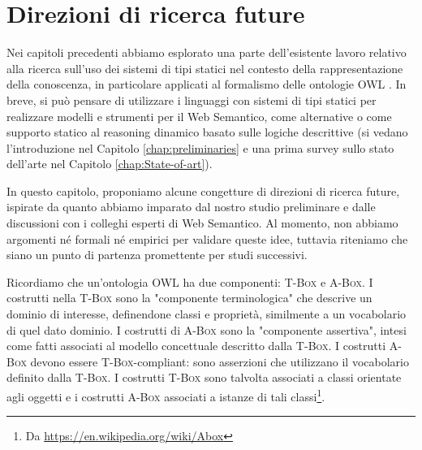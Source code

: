 
\chapter[Direzioni di ricerca future]{Direzioni di ricerca future}
\label{chap:FutureWork}

Nei capitoli precedenti abbiamo esplorato una parte dell'esistente lavoro relativo alla ricerca sull'uso dei sistemi di tipi statici nel contesto della 
rappresentazione della conoscenza, in particolare applicati al formalismo delle ontologie OWL \cite{OWL}. In breve, si può pensare di utilizzare i 
linguaggi con sistemi di tipi statici per realizzare modelli e strumenti per  il Web Semantico, come alternative o come supporto statico al reasoning 
dinamico basato sulle logiche descrittive (si vedano l'introduzione nel Capitolo \ref{chap:preliminaries} e una prima survey sullo stato dell'arte nel Capitolo \ref{chap:State-of-art}).

In questo capitolo, proponiamo alcune congetture di direzioni di ricerca future, ispirate da quanto abbiamo imparato dal nostro studio preliminare e dalle 
discussioni con i colleghi esperti di Web Semantico. Al momento, non abbiamo argomenti né formali né empirici per validare queste idee, tuttavia riteniamo 
che siano un punto di partenza promettente per studi successivi.

Ricordiamo che un'ontologia OWL ha due componenti: \textsc{T-Box} e \textsc{A-Box}. I costrutti nella \textsc{T-Box} sono la "componente terminologica" che descrive un dominio di 
interesse, definendone classi e proprietà, similmente a un vocabolario di quel dato dominio. I costrutti di \textsc{A-Box} sono la "componente assertiva", intesi come fatti associati al modello concettuale descritto dalla \textsc{T-Box}. I costrutti \textsc{A-Box} devono essere \textsc{T-Box}-compliant: sono asserzioni che utilizzano il 
vocabolario definito dalla \textsc{T-Box}. I costrutti \textsc{T-Box} sono talvolta associati a classi orientate agli oggetti e i costrutti \textsc{A-Box} associati a istanze di tali 
classi\footnote{Da \url{https://en.wikipedia.org/wiki/Abox}}.

